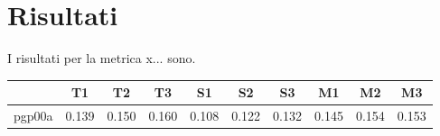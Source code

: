 \documentclass[12pt]{article}
\begin{document}
\section{Risultati}
I risultati per la metrica x... sono.

\begin{table}[H]
\centering
\begin{tabular}{cccccccccc}
  & \textbf{T1} & \textbf{T2} & \textbf{T3} & \textbf{S1} & \textbf{S2} & \textbf{S3} & \textbf{M1} & \textbf{M2} & \textbf{M3}\\ \hline 
pgp00a & 0.139 & 0.150 & 0.160 & 0.108 & 0.122 & 0.132 & 0.145 & 0.154 & 0.153\\ 
\end{tabular}
\end{table}
\end{document}
